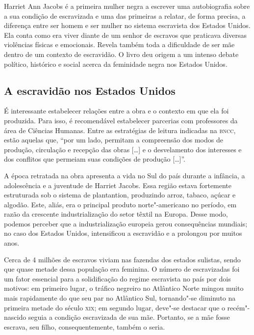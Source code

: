 \documentclass[12pt]{extarticle}
\begin{document}


Harriet Ann Jacobs é a primeira mulher negra a escrever uma
autobiografia sobre a sua condição de escravizada e uma das primeiras a
relatar, de forma precisa, a diferença entre ser homem e ser mulher no
sistema escravista dos Estados Unidos. Ela conta como era viver diante
de um senhor de escravos que praticava diversas violências físicas e
emocionais. Revela também toda a dificuldade de ser mãe dentro de um
contexto de escravidão. O livro deu origem a um intenso debate político,
histórico e social acerca da feminidade negra nos Estados Unidos.

\subsection{A escravidão nos Estados Unidos}

É interessante estabelecer relações entre a obra e o contexto em que ela
foi produzida. Para isso, é recomendável estabelecer parcerias com
professores da área de Ciências Humanas. Entre as estratégias de leitura
indicadas na \textsc{bncc}, estão aquelas que, ``por um lado, permitam a
compreensão dos modos de produção, circulação e recepção das obras
{[}\ldots{}{]} e o desvelamento dos interesses e dos conflitos que permeiam
suas condições de produção {[}\ldots{}{]}''.

A época retratada na obra apresenta a vida no Sul do país durante a
infância, a adolescência e a juventude de Harriet Jacobs. Essa região
estava fortemente estruturada sob o sistema de plantantion, produzindo
arroz, tabaco, açúcar e algodão. Este, aliás, era o principal produto
norte"-americano no período, em razão da crescente industrialização do
setor têxtil na Europa. Desse modo, podemos perceber que a
industrialização europeia gerou consequências mundiais; no caso dos
Estados Unidos, intensificou a escravidão e a prolongou por muitos anos.

Cerca de 4 milhões de escravos viviam nas fazendas dos estados sulistas,
sendo que quase metade dessa população era feminina. O número de
escravizadas foi um fator essencial para a solidificação do regime
escravista no país por dois motivos: em primeiro lugar, o tráfico
negreiro no Atlântico Norte mingou muito mais rapidamente do que seu par
no Atlântico Sul, tornando"-se diminuto na primeira metade do século \textsc{xix};
em segundo lugar, deve"-se destacar que o recém"-nascido seguia a condição
escravizada de sua mãe. Portanto, se a mãe fosse escrava, seu filho,
consequentemente, também o seria.
\end{document}
